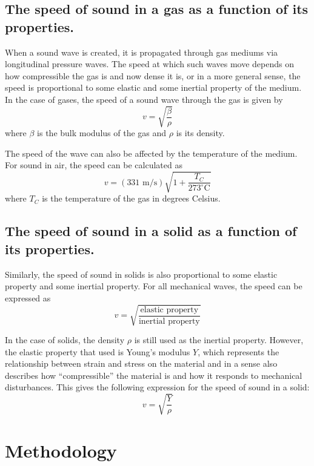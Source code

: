 \documentclass[twocolumn,english]{IEEEtran}
\theoremstyle{plain}
\theoremstyle{plain}
\begin{document}
\subsection*{The speed of sound in a gas as a function of its properties.}
When a sound wave is created, it is propagated through gas mediums via longitudinal pressure waves. The speed at which such waves move depends on how compressible the gas is and now dense it is, or in a more general sense, the speed is proportional to some elastic and some inertial property of the medium. In the case of gases, the speed of a sound wave through the gas is given by
\begin{equation}
 v=\sqrt{\frac{\beta}{\rho}}
\end{equation}
where $\beta$ is the bulk modulus of the gas and $\rho$ is its density.

The speed of the wave can also be affected by the temperature of the medium. For sound in air, the speed can be calculated as
\begin{equation}
 v=(331\text{ m/s})\sqrt{1+\frac{T_C}{273^{\circ}\text{C}}}
\end{equation}
where $T_C$ is the temperature of the gas in degrees Celsius.


\subsection*{The speed of sound in a solid as a function of its properties.}
Similarly, the speed of sound in solids is also proportional to some elastic property and some inertial property. For all mechanical waves, the speed can be expressed as
\begin{equation}
 v = \sqrt{\frac{\text{elastic property}}{\text{inertial property}}}
\end{equation}

In the case of solids, the density $\rho$ is still used as the inertial property. However, the elastic property that used is Young's modulus $Y$, which represents the relationship between strain and stress on the material and in a sense also describes how ``compressible'' the material is and how it responds to mechanical disturbances. This gives the following expression for the speed of sound in a solid:
\begin{equation}
 v=\sqrt{\frac{Y}{\rho}}
\end{equation}



\section{Methodology}
\end{document}
